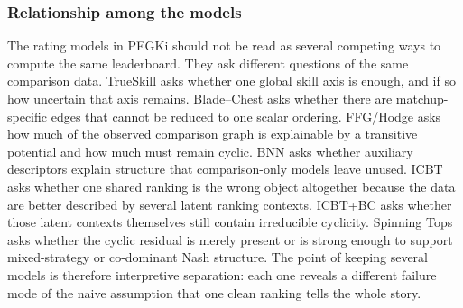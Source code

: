 \documentclass[twoside,twocolumn,9pt]{article}
\begin{document}
\subsubsection{Relationship among the models}

The rating models in PEGKi should not be read as several competing ways to compute the same leaderboard. They ask different questions of the same comparison data. TrueSkill asks whether one global skill axis is enough, and if so how uncertain that axis remains. Blade--Chest asks whether there are matchup-specific edges that cannot be reduced to one scalar ordering. FFG/Hodge asks how much of the observed comparison graph is explainable by a transitive potential and how much must remain cyclic. BNN asks whether auxiliary descriptors explain structure that comparison-only models leave unused. ICBT asks whether one shared ranking is the wrong object altogether because the data are better described by several latent ranking contexts. ICBT+BC asks whether those latent contexts themselves still contain irreducible cyclicity. Spinning Tops asks whether the cyclic residual is merely present or is strong enough to support mixed-strategy or co-dominant Nash structure. The point of keeping several models is therefore interpretive separation: each one reveals a different failure mode of the naive assumption that one clean ranking tells the whole story.
\end{document}
